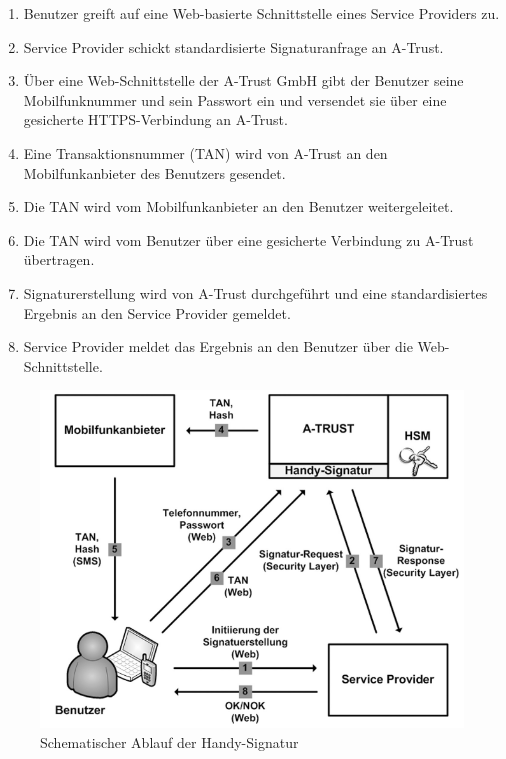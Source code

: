 \documentclass[11pt,a4paper,ngerman]{scrreprt}
\begin{document}
\begin{enumerate}
    \item Benutzer greift auf eine Web-basierte Schnittstelle eines Service Providers zu.
    \item Service Provider schickt standardisierte Signaturanfrage an A-Trust.
    \item Über eine Web-Schnittstelle der A-Trust GmbH gibt der Benutzer seine Mobilfunknummer und sein Passwort ein und versendet sie über eine gesicherte HTTPS-Verbindung an A-Trust.
    \item Eine Transaktionsnummer (TAN) wird von A-Trust an den Mobilfunkanbieter des Benutzers gesendet.
    \item Die TAN wird vom Mobilfunkanbieter an den Benutzer weitergeleitet.
    \item Die TAN wird vom Benutzer über eine gesicherte Verbindung zu A-Trust übertragen.
    \item Signaturerstellung wird von A-Trust durchgeführt und eine standardisiertes Ergebnis an den Service Provider gemeldet.
    \item Service Provider meldet das Ergebnis an den Benutzer über die Web-Schnittstelle.
\end{enumerate}
\begin{figure}[htbp]
    \centering
        \includegraphics[width=\textwidth]{Abbildungen/Ablauf_Handy-Signatur.png}
    \caption{Schematischer Ablauf der Handy-Signatur}
    \label{fig:HandySignaturablauf}
\end{figure}
\end{document}
